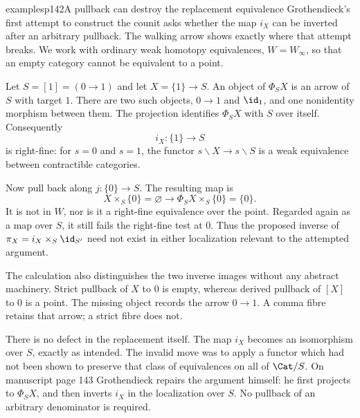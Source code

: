 \begin{dcomment}{examples}{p142}{A pullback can destroy the replacement equivalence}
Grothendieck's first attempt to construct the counit asks whether the map $i_X$ can be inverted after an arbitrary pullback. The walking arrow shows exactly where that attempt breaks. We work with ordinary weak homotopy equivalences, $W=W_\infty$, so that an empty category cannot be equivalent to a point.

Let $S=[1]=(0\longrightarrow1)$ and let $X=\{1\}\longrightarrow S$. An object of $\Phi_SX$ is an arrow of $S$ with target $1$. There are two such objects, $0\longrightarrow1$ and $\id_1$, and one nonidentity morphism between them. The projection identifies $\Phi_SX$ with $S$ over itself. Consequently
\[
 i_X:\{1\}\longrightarrow S
\]
is right-fine: for $s=0$ and $s=1$, the functor $s\backslash X\longrightarrow s\backslash S$ is a weak equivalence between contractible categories.

Now pull back along $j:\{0\}\longrightarrow S$. The resulting map is
\[
 X\times_S\{0\}=\varnothing
 \longrightarrow
 \Phi_SX\times_S\{0\}=\{0\}.
\]
It is not in $W$, nor is it a right-fine equivalence over the point. Regarded again as a map over $S$, it still fails the right-fine test at $0$. Thus the proposed inverse of $\pi_X=i_X\times_S\id_{S'}$ need not exist in either localization relevant to the attempted argument.

The calculation also distinguishes the two inverse images without any abstract machinery. Strict pullback of $X$ to $0$ is empty, whereas derived pullback of $[X]$ to $0$ is a point. The missing object records the arrow $0\longrightarrow1$. A comma fibre retains that arrow; a strict fibre does not.

There is no defect in the replacement itself. The map $i_X$ becomes an isomorphism over $S$, exactly as intended. The invalid move was to apply a functor which had not been shown to preserve that class of equivalences on all of $\Cat/S$. On manuscript page 143 Grothendieck repairs the argument himself: he first projects to $\Phi_SX$, and then inverts $i_X$ in the localization over $S$. No pullback of an arbitrary denominator is required.
\end{dcomment}
